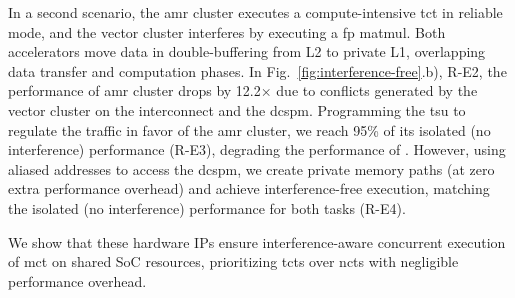 In a second scenario, the \gls{amr} cluster executes a compute-intensive \gls{tct} in reliable mode, and the vector cluster interferes by executing a \gls{fp} \gls{matmul}. Both accelerators move data in double-buffering from L2 to private L1, overlapping data transfer and computation phases. 
In Fig.~\ref{fig:interference-free}.b), R-E2, the performance of \gls{amr} cluster drops by 12.2$\times$ due to conflicts generated by the vector cluster on the interconnect and the \gls{dcspm}. Programming the \gls{tsu} to regulate the traffic in favor of the \gls{amr} cluster, we reach 95\% of its isolated (no interference) performance (R-E3), degrading the performance of . However, using aliased addresses to access the \gls{dcspm}, we create private memory paths (at zero extra performance overhead) and achieve interference-free execution, matching the isolated (no interference) performance for both tasks  (R-E4).

We show that these hardware IPs ensure interference-aware concurrent execution of \gls{mct} on shared SoC resources, prioritizing \glspl{tct} over \glspl{nct}   with negligible performance overhead.







